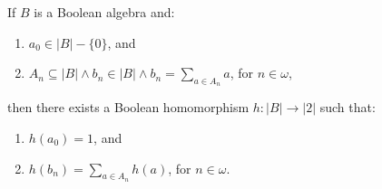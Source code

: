 If $B$ is a Boolean algebra and:
\begin{enumerate}
\item $a_0 \in |B| - \{0\}$, and
\item $A_n \subseteq |B| \land b_n \in |B| \land b_n = \sum_{a \in A_n} a$, for $n \in \omega$,
\end{enumerate}
then there exists a Boolean homomorphism $h: |B| \rightarrow |2|$ such that:
\begin{enumerate}
\item $h(a_0) = 1$, and
\item $h(b_n) = \sum_{a \in A_n} h(a)$, for $n \in \omega$.
\end{enumerate}
